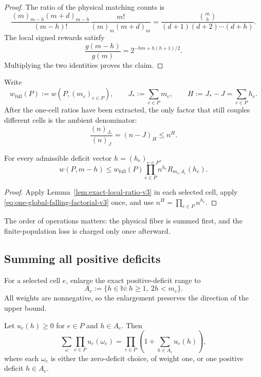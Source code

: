 \begin{proof}
The ratio of the physical matching counts is
\[
  \frac{(m)_{m-h}(m+d)_{m-h}}{(m-h)!}
  \frac{m!}{(m)_m(m+d)_m}
  =
  \frac{\binom mh}{(d+1)(d+2)\cdots(d+h)}.
\]
The local signed rewards satisfy
\[
  \frac{g(m-h)}{g(m)}
  =
  2^{-hm+h(h+1)/2}.
\]
Multiplying the two identities proves the claim.
\end{proof}

Write
\[
  w_{\mathrm{full}}(P):=w(P,(m_e)_{e\in P}),
  \qquad
  J_*:=\sum_{e\in P}m_e,
  \qquad
  H:=J_*-J=\sum_{e\in P}h_e.
\]
After the one-cell ratios have been extracted, the only factor that still
couples different cells is the ambient denominator:
\begin{equation}
  \frac{(n)_{J_*}}{(n)_J}
  =(n-J)_H
  \le n^H.
  \label{eq:one-global-falling-factorial-v3}
\end{equation}

\begin{lemma}
\label{lem:aggregate-deficit-comparison-v3}
For every admissible deficit vector $h=(h_e)_{e\in P}$,
\begin{equation}
  w(P,m-h)
  \le
  w_{\mathrm{full}}(P)
  \prod_{e\in P}n^{h_e}R_{m_e,d_e}(h_e).
  \label{eq:aggregate-deficit-comparison-v3}
\end{equation}
\end{lemma}

\begin{proof}
Apply Lemma~\ref{lem:exact-local-ratio-v3} in each selected cell, apply
\eqref{eq:one-global-falling-factorial-v3} once, and use
$n^H=\prod_{e\in P}n^{h_e}$.
\end{proof}

The order of operations matters: the physical fiber is summed first, and the
finite-population loss is charged only once afterward.

\subsection{Summing all positive deficits}

For a selected cell $e$, enlarge the exact positive-deficit range to
\[
  A_e:=\{h\in\mathbb N:h\ge1,\ 2h<m_e\}.
\]
All weights are nonnegative, so the enlargement preserves the direction of the
upper bound.

\begin{lemma}
\label{lem:optional-choice-product-v3}
Let $u_e(h)\ge0$ for $e\in P$ and $h\in A_e$. Then
\[
  \sum_{\omega}
    \prod_{e\in P}u_e(\omega_e)
  =
  \prod_{e\in P}
    \left(1+\sum_{h\in A_e}u_e(h)\right),
\]
where each $\omega_e$ is either the zero-deficit choice, of weight one, or one
positive deficit $h\in A_e$.
\end{lemma}

